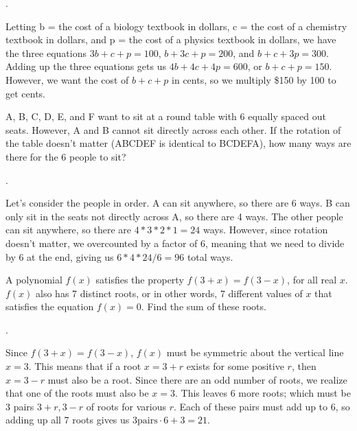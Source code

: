 \documentclass[11pt]{article}
\begin{document}
\begin{answer}
.
\end{answer}

\begin{solution}
Letting b = the cost of a biology textbook in dollars, c = the cost of a chemistry textbook in dollars, and p = the cost of a physics textbook in dollars, we have the three equations $3b + c + p = 100$, $b + 3c + p = 200$, and $b + c + 3p = 300$. Adding up the three equations gets us $4b + 4c + 4p = 600$, or $b + c + p = 150$. However, we want the cost of $b + c + p$ in cents, so we multiply \$150 by 100 to get  cents.
\end{solution}

\begin{problem}
A, B, C, D, E, and F want to sit at a round table with 6 equally spaced out seats. However, A and B cannot sit directly across each other. If the rotation of the table doesn't matter (ABCDEF is identical to BCDEFA), how many ways are there for the 6 people to sit?
\end{problem}

\begin{answer}
.
\end{answer}

\begin{solution}
Let's consider the people in order. A can sit anywhere, so there are 6 ways. B can only sit in the seats not directly across A, so there are 4 ways. The other people can sit anywhere, so there are $4*3*2*1 = 24$ ways. However, since rotation doesn't matter, we overcounted by a factor of $6$, meaning that we need to divide by $6$ at the end, giving us $6*4*24/6 = 96$ total ways.
\end{solution}

\begin{problem}
A polynomial $f(x)$ satisfies the property $f(3+x) = f(3-x)$, for all real $x$. $f(x)$ also has 7 distinct roots, or in other words, 7 different values of $x$ that satisfies the equation $f(x) = 0$. Find the sum of these roots.
\end{problem}

\begin{answer}
.
\end{answer}

\begin{solution}
Since $f(3+x) = f(3-x)$, $f(x)$ must be symmetric about the vertical line $x = 3$. This means that if a root $x = 3 + r$ exists for some positive $r$, then $x = 3 - r$ must also be a root. Since there are an odd number of roots, we realize that one of the roots must also be $x = 3$. This leaves 6 more roots; which must be 3 pairs ${3+r, 3-r}$ of roots for various $r$. Each of these pairs must add up to 6, so adding up all 7 roots gives us $3\text{pairs}\cdot6 + 3 = \boxed{21}$.
\end{solution}
\end{document}
